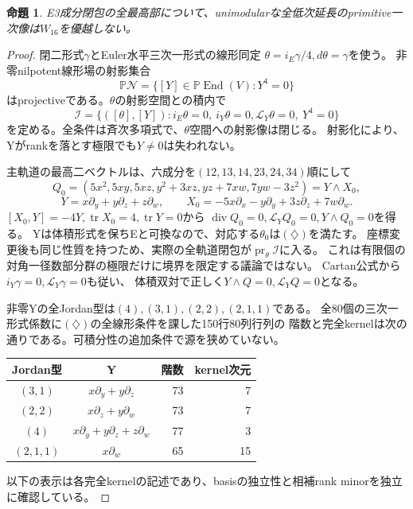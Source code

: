 \documentclass[a4paper,11pt]{ltjsarticle}
\newtheorem{proposition}{命題}[section]
\theoremstyle{definition}
\begin{document}
\begin{proposition}\label{prop:unimodular-exceptional-boundary}
E3成分閉包の全最高部について、unimodularな全低次延長のprimitive一次像は$W_{16}$を優越しない。
\end{proposition}
\begin{proof}
閉二形式$\gamma$とEuler水平三次一形式の線形同定
$\theta=i_E\gamma/4,d\theta=\gamma$を使う。
非零nilpotent線形場の射影集合
\[
 \mathbb P\mathcal N=\{[Y]\in\mathbb P\operatorname{End}(V):Y^4=0\}
\]
はprojectiveである。$\theta$の射影空間との積内で
\[
 \mathcal I=\{([\theta],[Y]):i_E\theta=0,\ i_Y\theta=0,
          \mathcal L_Y\theta=0,\ Y^4=0\}                         \tag{\diamondsuit}
\]
を定める。全条件は斉次多項式で、$\theta$空間への射影像は閉じる。
射影化により、Yがrankを落とす極限でも$Y\ne0$は失われない。

主軌道の最高二ベクトルは、六成分を$(12,13,14,23,24,34)$順にして
\[
 Q_0=(5x^2,5xy,5xz,y^2+3xz,yz+7xw,7yw-3z^2)
     =Y\wedge X_0,
\]
\[
 Y=x\partial_y+y\partial_z+z\partial_w,\qquad
 X_0=-5x\partial_x-y\partial_y+3z\partial_z+7w\partial_w.
\]
$[X_0,Y]=-4Y,\operatorname{tr}X_0=4,\operatorname{tr}Y=0$から
$\operatorname{div}Q_0=0,\mathcal L_YQ_0=0,Y\wedge Q_0=0$を得る。
Yは体積形式を保ちEと可換なので、対応する$\theta_0$は$(\diamondsuit)$を満たす。
座標変更後も同じ性質を持つため、実際の全軌道閉包が$\operatorname{pr}_\theta\mathcal I$に入る。
これは有限個の対角一径数部分群の極限だけに境界を限定する議論ではない。
Cartan公式から$i_Y\gamma=0,\mathcal L_Y\gamma=0$も従い、
体積双対で正しく$Y\wedge Q=0,\mathcal L_YQ=0$となる。

非零Yの全Jordan型は$(4),(3,1),(2,2),(2,1,1)$である。
全80個の三次一形式係数に$(\diamondsuit)$の全線形条件を課した150行80列行列の
階数と完全kernelは次の通りである。可積分性の追加条件で源を狭めていない。
\begin{center}\small
\begin{tabular}{c|c|r|r}
Jordan型&Y&階数&kernel次元\\\hline
$(3,1)$&$x\partial_y+y\partial_z$&73&7\\
$(2,2)$&$x\partial_z+y\partial_w$&73&7\\
$(4)$&$x\partial_y+y\partial_z+z\partial_w$&77&3\\
$(2,1,1)$&$x\partial_w$&65&15
\end{tabular}
\end{center}
以下の表示は各完全kernelの記述であり、basisの独立性と相補rank minorを独立に確認している。


\end{proof}
\end{document}
